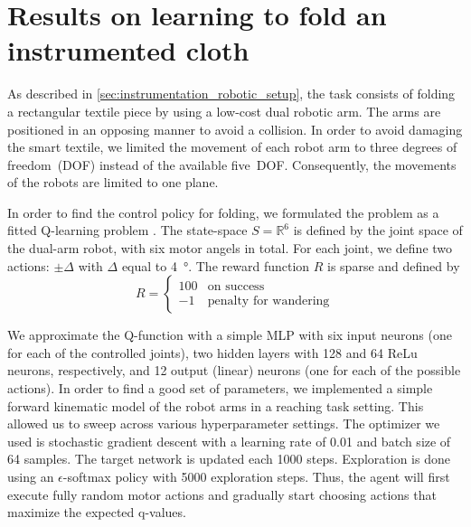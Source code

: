 \documentclass[\home/main.tex]{subfiles}
\begin{document}

\section{Results on learning to fold an instrumented cloth}\label{sec:instrumentation_results}

As described in \cref{sec:instrumentation_robotic_setup}, the task consists of folding a rectangular textile piece by using a low-cost dual robotic arm. The arms are positioned in an opposing manner to avoid a collision. In order to avoid damaging the smart textile, we limited the movement of each robot arm to three degrees of freedom~(DOF) instead of the available five~DOF. Consequently, the movements of the robots are limited to one plane.

In order to find the control policy for folding, we formulated the problem as a fitted Q-learning problem \autocite{Watkins1992}. The state-space $S=\mathbb{R}^6$ is defined by the joint space of the dual-arm robot, with six motor angels in total. For each joint, we define two actions: $\pm \Delta$ with $\Delta$ equal to \qty{4}{\degree}. The reward function $R$ is sparse and defined by
\begin{equation} \label{eq:instr_reward_function}
    R=
    \begin{cases}
        100 & \text{on success}            \\
        -1  & \text{penalty for wandering}
    \end{cases}
\end{equation}

We approximate the Q-function with a simple MLP with six input neurons (one for each of the controlled joints), two hidden layers with 128 and 64 ReLu neurons, respectively, and \qty{12}{} output (linear) neurons (one for each of the possible actions). In order to find a good set of parameters, we implemented a simple forward kinematic model of the robot arms in a reaching task setting. This allowed us to sweep across various hyperparameter settings. The optimizer we used is stochastic gradient descent with a learning rate of \qty{0.01}{} and batch size of \qty{64}{} samples. The target network is updated each \qty{1000}{} steps. Exploration is done using an $\epsilon$-softmax policy with \qty{5000}{} exploration steps. Thus, the agent will first execute fully random motor actions and gradually start choosing actions that maximize the expected q-values.
\end{document}
